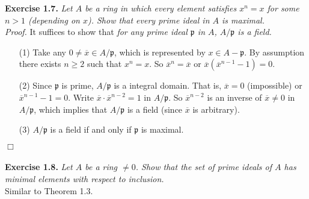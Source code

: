 \documentclass{article}
\begin{document}



\textbf{Exercise 1.7.}
\emph{Let $A$ be a ring in which every element satisfies
$x^n = x$ for some $n > 1$ (depending on $x$).
Show that every prime ideal in $A$ is maximal.} \\

\emph{Proof.}
It suffices to show that
\emph{for any prime ideal $\mathfrak{p}$ in $A$, $A/\mathfrak{p}$ is a field.}
\begin{enumerate}
\item[(1)]
Take any $0 \neq \overline{x} \in A/\mathfrak{p}$,
which is represented by $x \in A-\mathfrak{p}$.
By assumption there exists $n \geq 2$ such that $x^n = x$.
So $\overline{x}^n = \overline{x}$ or $\overline{x}(\overline{x}^{n-1} - 1) = 0$.
\item[(2)]
Since $\mathfrak{p}$ is prime, $A/\mathfrak{p}$ is a integral domain.
That is, $\overline{x} = 0$ (impossible) or $\overline{x}^{n-1} - 1 = 0$.
Write $\overline{x} \cdot \overline{x}^{n-2} = 1$ in $A/\mathfrak{p}$.
So $\overline{x}^{n-2}$ is an inverse of $\overline{x} \neq 0$ in $A/\mathfrak{p}$,
which implies that $A/\mathfrak{p}$ is a field (since $\overline{x}$ is arbitrary).
\item[(3)]
$A/\mathfrak{p}$ is a field if and only if $\mathfrak{p}$ is maximal.
\end{enumerate}
$\Box$ \\\\






\textbf{Exercise 1.8.}
\emph{Let $A$ be a ring $\neq 0$.
Show that the set of prime ideals of $A$ has minimal elements
with respect to inclusion.} \\

Similar to Theorem 1.3. \\
\end{document}
